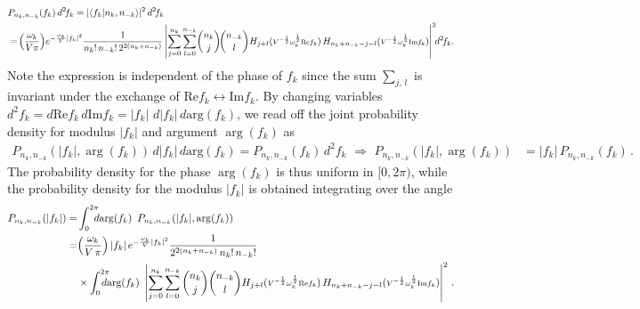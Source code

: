 \documentclass[../QFT_main.tex]{subfiles}
\begin{document}
\begin{mytheorem}
{\small
\begin{align}
    &P_{n_k, n_{-k}}(f_k) \,d^2\!f_k = |\langle f_k | n_k, n_{-k} \rangle|^2 \,d^2\!f_k\,
    \\
    &=\! \Big(\frac{\omega_k}{V \pi}\Big) 
    e^{-\frac{\omega_k}{V} |f_k|^2} \frac{1}{n_k!\, n_{-k}!\,2^{2(n_k + n_{-k})}} 
    \left| \sum_{j=0}^{n_k} \sum_{l=0}^{n_{-k}} \!\binom{n_k}{j}\! \binom{n_{-k}}{l}  H_{j+l}(\text{\scriptsize $V^{-\frac{1}{2}}\omega_k^{\frac{1}{2}}\text{Re}f_k$})\, H_{n_k + n_{-k} - j-l}(\text{\scriptsize $V^{-\frac{1}{2}}\omega_k^{\frac{1}{2}}\text{Im}f_k$}) \right|^2\! \!d^2\!f_k.
\end{align}
}
% 
Note the expression is independent of the phase of $f_k$ since the sum $\sum_{j,\,l}$ is invariant under the exchange of $\text{Re}f_k \leftrightarrow \text{Im}f_k$.
%
By changing variables $d^2\!f_k = d\text{Re}f_k\, d\text{Im}f_k = |f_k|\, \,d|f_k|\, d\text{arg}(f_k)$, we read off the joint probability density for modulus $|f_k|$ and argument $\arg(f_k)$ as
\begin{align}
    P_{n_k, n_{-k}}(|f_k|,\arg(f_k)) \,d|f_k|\,d\text{arg}(f_k) 
    = P_{n_k, n_{-k}}(f_k) \,d^2\!f_k \,\, \Rightarrow \,\,
    P_{n_k, n_{-k}}(|f_k|,\arg(f_k)) &= |f_k| \, P_{n_k, n_{-k}}(f_k)\,.
\end{align}
%
The probability density for the phase {$\arg(f_k)$} is thus uniform in {$[0, 2\pi)$}, while the probability density for the modulus $|f_k|$ is obtained integrating over the angle
{
\begin{align}\label{eq:probability_modulus_fk_single_mode}
    P_{n_k, n_{-k}}(|f_k|) 
    =& \int_0^{2\pi} \!\!\!\!d\text{arg}(f_k) \,\,\, P_{n_k, n_{-k}}(|f_k|,\arg(f_k)) 
    \\
    =&
    \Big(\frac{\omega_k}{V\,\pi}\Big) \, |f_k| \, e^{-\frac{\omega_k}{V} |f_k|^2} 
    \frac{1}{2^{2(n_k + n_{-k})}\,n_k!\, n_{-k}!}
    \\
    &\times\int_0^{2\pi} \!\!\!\!\!\!d\text{arg}(f_k)\,\,
    \left| \sum_{j=0}^{n_k} \sum_{l=0}^{n_{-k}} \binom{n_k}{j} \binom{n_{-k}}{l}  H_{j+l}(\text{\scriptsize $V^{-\frac{1}{2}}\omega_k^{\frac{1}{2}}\text{Re}f_k$})\, H_{n_k + n_{-k} - j-l}(\text{\scriptsize $V^{-\frac{1}{2}}\omega_k^{\frac{1}{2}}\text{Im}f_k$}) \right|^2 \,.
\end{align}
}
%
\end{mytheorem}
\end{document}

